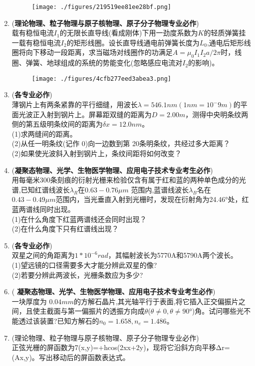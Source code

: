 \begin{enumerate}
\begin{figure}[ht]
\centering
\texttt{[image: ./figures/219519ee81ee28bf.png]}
\caption{} \label{fig_CD06_4}
\end{figure}
\item (\textbf{理论物理、粒子物理与原子核物理、原子分子物理专业必作})\\
载有稳恒电流$I_1$的无限长直导线(看成刚体)下用一劲度系数为$K$的轻质弹簧挂一载有稳恒电流$I_2$的矩形线圈。设长直导线通电前弹簧长度为$L_0$,通电后矩形线圈将向下移动一段距离，求当磁场对线圈作的功满足$A=\mu_0I_1I_2a/2 \pi$时，线圈、弹簧、地球组成的系统的势能变化(忽略感应电流对$I_2$的影响)。
\begin{figure}[ht]
\centering
\texttt{[image: ./figures/4cfb277eed3abea3.png]}
\caption{} \label{fig_CD06_5}
\end{figure}
\item (\textbf{各专业必作})\\
薄钢片上有两条紧靠的平行细缝，用波长$\lambda=546.1nm(1nm=10^-9m)$的平面光波正入射到钢片上。屏幕距双缝的距离为$D=2.00m$，测得中央明条纹两侧的第五级明条纹间的距离为$\delta x=12.0nm$。\\
(1)求两缝间的距离。\\
(2)从任一明条纹(记作 0)向一边数到第 20条明条纹，共经过多大距离？\\
(2)如果使光波斜入射到钢片上，条纹间距将如何改变？
\item (\textbf{凝聚态物理、光学、生物医学物理、应用电子技术专业考生必作})\\
用每毫米$ 300 $条刻痕的衍射光栅来检验仅含有属于红和蓝的两种单色成分的光谱,已知红谱线波长$\lambda_R$在$0.63-0.76\mu m$ 范围内,蓝谱线波长$\lambda_B$名在 $0.43-0.49 \mu m$范围内，当光垂直入射到光栅时，发现在衍射角为24.46°处，红蓝两谱线同时出现。\\
(1)在什么角度下红蓝两谱线还会同时出现？\\
(2)在什么角度下只有红谱线出现？
\item (\textbf{各专业必作})\\
双星之间的角距离为$1*10^{-6}rad$，其幅射波长为5770A和5790A两个波长。\\
(1)望远镜的口径需要多大才能分辨此双星的像?\\
(2)若要分辨此两波长，光栅条数应为多少?
\item ( \textbf{凝聚态物理、光学、生物医学物理、应用电子技术专业考生必作})\\
一块厚度为 $0.04mm$的方解石晶片,其光轴平行于表面,将它插入正交偏振片之间，且使主截面与第一偏振片的透振方向成$\theta$($\theta \neq 0,\theta \neq 90$°)角。试问哪些光不能透过该装置?已知方解石的$n_0=1.658,n_e=1.486$。
\item (理论物理、粒子物理与原子核物理、原子分子物理专业必作)\\
正弦光栅的屏函数为7(x,y)=+hcos(2xx+2y)，现将它沿斜方向平移Δr=(Ax,y)。写出移动后的屏函数表达式。
\end{enumerate}